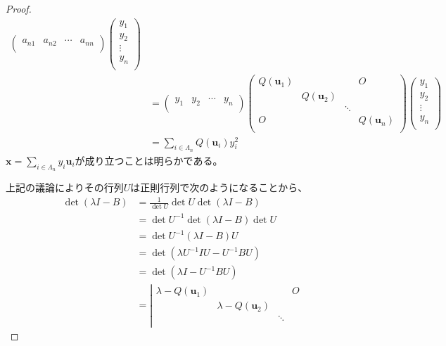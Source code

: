 \documentclass[dvipdfmx]{jsarticle}
\begin{document}
\begin{proof}
\begin{align*}
\begin{pmatrix}
a_{n1} & a_{n2} & \cdots & a_{nn} \\
\end{pmatrix}\begin{pmatrix}
y_{1} \\
y_{2} \\
 \vdots \\
y_{n} \\
\end{pmatrix}\\
&= \begin{pmatrix}
y_{1} & y_{2} & \cdots & y_{n} \\
\end{pmatrix}\begin{pmatrix}
Q\left( \mathbf{u}_{1} \right) & \  & \  & O \\
\  & Q\left( \mathbf{u}_{2} \right) & \  & \  \\
\  & \  & \ddots & \  \\
O & \  & \  & Q\left( \mathbf{u}_{n} \right) \\
\end{pmatrix}\begin{pmatrix}
y_{1} \\
y_{2} \\
 \vdots \\
y_{n} \\
\end{pmatrix}\\
&= \sum_{i \in \varLambda_{n}} {Q\left( \mathbf{u}_{i} \right)y_{i}^{2}}
\end{align*}
$\mathbf{x} = \sum_{i \in \varLambda_{n}} {y_{i}\mathbf{u}_{i}}$が成り立つことは明らかである。\par
上記の議論によりその行列$U$は正則行列で次のようになることから、
\begin{align*}
\det(\lambda I - B) &= \frac{1}{\det U}\det U\det(\lambda I - B)\\
&= \det U^{- 1}\det(\lambda I - B)\det U\\
&= \det{U^{- 1}(\lambda I - B)U}\\
&= \det\left( \lambda U^{- 1}IU - U^{- 1}BU \right)\\
&= \det\left( \lambda I - U^{- 1}BU \right)\\
&= \left| \begin{matrix}
\lambda - Q\left( \mathbf{u}_{1} \right) & \  & \  & O \\
\  & \lambda - Q\left( \mathbf{u}_{2} \right) & \  & \  \\
\  & \  & \ddots & \  \\

\end{matrix}
\end{align*}
\end{proof}
\end{document}
